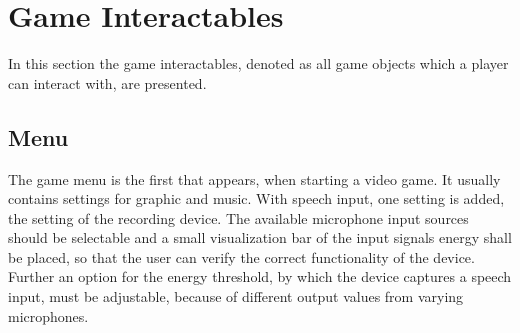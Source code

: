 
\section{Game Interactables}
In this section the game interactables, denoted as all game objects which a player can interact with, are presented.

\subsection{Menu}
The game menu is the first that appears, when starting a video game. 
It usually contains settings for graphic and music.
With speech input, one setting is added, the setting of the recording device.
The available microphone input sources should be selectable and a small visualization bar of the input signals energy shall be placed, so that the user can verify the correct functionality of the device.
Further an option for the energy threshold, by which the device captures a speech input, must be adjustable, because of different output values from varying microphones.
